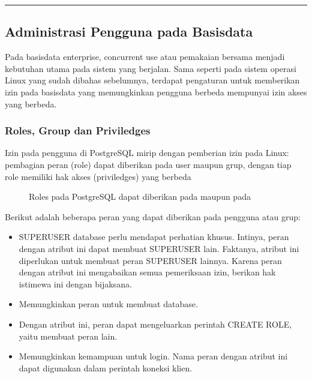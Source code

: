 \documentclass[letterpaper,10pt,english]{sphinxmanual}
\let\sphinxpxdimen\pdfpxdimen\else\newdimen\sphinxpxdimen
\begin{document}
\bigskip\hrule\bigskip



\subsection{Administrasi Pengguna pada Basisdata}
\label{\detokenize{sesi2/dbmanagement:administrasi-pengguna-pada-basisdata}}\label{\detokenize{sesi2/dbmanagement::doc}}
Pada basisdata enterprise, concurrent use atau pemakaian bersama menjadi kebutuhan utama pada sistem yang berjalan. Sama seperti pada sistem operasi Linux yang sudah dibahas sebelumnya, terdapat pengaturan untuk memberikan izin pada basisdata yang memungkinkan pengguna berbeda mempunyai izin akses yang berbeda.


\subsubsection{Roles, Group dan Priviledges}
\label{\detokenize{sesi2/dbmanagement:roles-group-dan-priviledges}}
Izin pada pengguna di PostgreSQL mirip dengan pemberian izin pada Linux: pembagian peran (role) dapat diberikan pada user maupun grup, dengan tiap role memiliki hak akses (priviledges) yang berbeda

\begin{figure}[htbp]
\centering
\capstart

\noindent\sphinxincludegraphics[height=400\sphinxpxdimen]{{2020-12-03-09-08-19}.png}
\caption{Roles pada PostgreSQL dapat diberikan pada  maupun pada }\label{\detokenize{sesi2/dbmanagement:pgroles}}\end{figure}

Berikut adalah beberapa peran yang dapat diberikan pada pengguna atau grup:
\begin{itemize}
\item {} 
 \sphinxhyphen{} SUPERUSER database perlu mendapat perhatian khusus. Intinya, peran dengan atribut ini dapat membuat SUPERUSER lain. Faktanya, atribut ini diperlukan untuk membuat peran SUPERUSER lainnya. Karena peran dengan atribut ini mengabaikan semua pemeriksaan izin, berikan hak istimewa ini dengan bijaksana.

\item {} 
 \sphinxhyphen{} Memungkinkan peran untuk membuat database.

\item {} 
 \sphinxhyphen{} Dengan atribut ini, peran dapat mengeluarkan perintah CREATE ROLE, yaitu membuat peran lain.

\item {} 
 \sphinxhyphen{} Memungkinkan kemampuan untuk login. Nama peran dengan atribut ini dapat digunakan dalam perintah koneksi klien.

\end{itemize}
\end{document}
